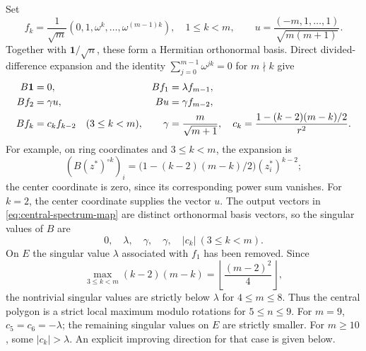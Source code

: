\documentclass[11pt]{article}
\theoremstyle{remark}
\numberwithin{equation}{section}
\begin{document}
Set
\[
 f_k=\frac1{\sqrt m}(0,1,\omega^k,\ldots,\omega^{(m-1)k}),
 \quad 1\le k<m,\qquad
 u=\frac{(-m,1,\ldots,1)}{\sqrt{m(m+1)}}.
\]
Together with $\mathbf1/\sqrt n$, these form a Hermitian orthonormal
basis. Direct divided-difference expansion and the identity
$\sum_{j=0}^{m-1}\omega^{jk}=0$ for $m\nmid k$ give
\begin{align}
 B\mathbf1&=0,& Bf_1&=\lambda f_{m-1},\notag\\
 Bf_2&=\gamma u,& Bu&=\gamma f_{m-2},\label{eq:central-spectrum-map}\\
 Bf_k&=c_kf_{k-2}\quad(3\le k<m),&
 \gamma&=\frac m{\sqrt{m+1}},\quad
 c_k=\frac{1-(k-2)(m-k)/2}{r^2}.\notag
\end{align}
For example, on ring coordinates and $3\le k<m$, the expansion is
\[
 (B(z^*)^{\circ k})_i
 =\bigl(1-(k-2)(m-k)/2\bigr)(z_i^*)^{k-2};
\]
the center coordinate is zero, since its corresponding power sum
vanishes. For $k=2$, the center coordinate supplies the vector $u$.
The output vectors in \eqref{eq:central-spectrum-map} are distinct
orthonormal basis vectors, so the singular values of $B$ are
\begin{equation}\label{eq:central-singular-values}
 0,\quad\lambda,\quad\gamma,\quad\gamma,
 \quad |c_k|\ (3\le k<m).
\end{equation}
On $E$ the singular value $\lambda$ associated with $f_1$
has been removed. Since
\[
 \max_{3\le k<m}(k-2)(m-k)
 =\left\lfloor\frac{(m-2)^2}{4}\right\rfloor,
\]
the nontrivial singular values are strictly below $\lambda$
for $4\le m\le8$. Thus the central polygon is a strict local
maximum modulo rotations for $5\le n\le9$.
For $m=9$, $c_5=c_6=-\lambda$; the remaining singular values on $E$
are strictly smaller. For $m\ge10$, some $|c_k|>\lambda$.
An explicit improving direction for that case is given below.
\end{document}

